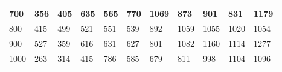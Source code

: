 \documentclass[10pt,letterpaper]{article}
\begin{document}
\begin{center}
\begin{table}
\begin{tabular} { |m{0.5cm}|m{1.3cm}|m{1.3cm}|m{1.3cm}|m{1.3cm}|m{1.3cm}|m{1.3cm}|m{1.3cm}|m{1.3cm}|m{1.3cm}|m{1.3cm}|}
\hline
\cellcolor{Gray}700 & \Large 356 & \Large 405 & \Large 635 & \Large 565 & \Large 770 & \Large 1069 & \Large 873 & \Large 901 & \Large 831 & \Large 1179 \\
\hline
\cellcolor{Gray}800 & \Large 415 & \Large 499 & \Large 521 & \Large 551 & \Large 539 & \Large 892 & \Large 1059 & \Large 1055 & \Large 1020 & \Large 1054 \\
\hline
\cellcolor{Gray}900 & \Large 527 & \Large 359 & \Large 616 & \Large 631 & \Large 627 & \Large 801 & \Large 1082 & \Large 1160 & \Large 1114 & \Large 1277 \\
\hline
\cellcolor{Gray}1000 & \Large 263 & \Large 314 & \Large 415 & \Large 786 & \Large 585 & \Large 679 & \Large 811 & \Large 998 & \Large 1104 & \Large 1096 \\
\hline
\end{tabular} \\
\end{table}
\end{center}
\newpage 
{}
\end{document}
